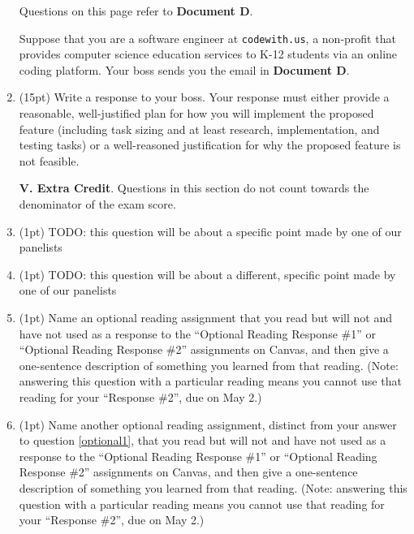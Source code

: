\documentclass{report}
\newif\ifkey
\newcommand{\answerlong}[1]{\ifkey\color{red}\textbf{#1}\color{black}\else\vspace{0.5in}\fi\xspace}
\newcommand*{\pts}[1]{\addtocounter{points}{#1}(#1pt)}
\newcommand{\ecpts}[1]{\addtocounter{ecpoints}{#1}(#1pt)}
\begin{document}
\begin{spacing}{1.4}
\begin{enumerate}[leftmargin=*]
    \newpage

    Questions on this page refer to \textbf{Document D}.

    Suppose that you are a software engineer at \lstinline{codewith.us}, a non-profit that provides computer science education
    services to K-12 students via an online coding platform. Your boss sends you the email in \textbf{Document D}.

  \item \pts{15} Write a response to your boss. Your response must either provide a reasonable, well-justified plan
    for how you will implement the proposed feature (including task sizing and at least research, implementation, and testing tasks)
    or a well-reasoned justification for why the proposed feature is not feasible.

    \answerlong{The proposed feature is an instance of the halting problem, and Mr. Rice's insistence that
      you get the correct answer 100\% of the time means that it is impossible to implement the feature as described.
    Correct answers must be phrased as an email, and use a polite but firm tone.}

    \newpage
    
    \textbf{V. Extra Credit}. Questions in this section do not count towards the denominator of the exam score.

  \item \ecpts{1} TODO: this question will be about a specific point made by one of our panelists
    \answerlong{TODO}

  \item \ecpts{1} TODO: this question will be about a different, specific point made by one of our panelists
    \answerlong{TODO}
  
  \item \ecpts{1} \label{optional1} Name an optional reading assignment that you read but will not and have not used as a response to the ``Optional Reading Response \#1''
    or ``Optional Reading Response \#2'' assignments on Canvas, and then give a one-sentence description of something you learned from that reading.
    (Note: answering this question with a particular reading means you cannot use that reading for your ``Response \#2'', due on May 2.)
    \answerlong{Answers vary.}
    
  \item \ecpts{1} Name another optional reading assignment, distinct from your answer to question \ref{optional1},
    that you read but will not and have not used as a response to the ``Optional Reading Response \#1''
    or ``Optional Reading Response \#2'' assignments on Canvas, and then give a one-sentence description of something you learned from that reading.
    (Note: answering this question with a particular reading means you cannot use that reading for your ``Response \#2'', due on May 2.)
    \answerlong{Answers vary.}
    

\end{enumerate}
\end{spacing}
\end{document}
